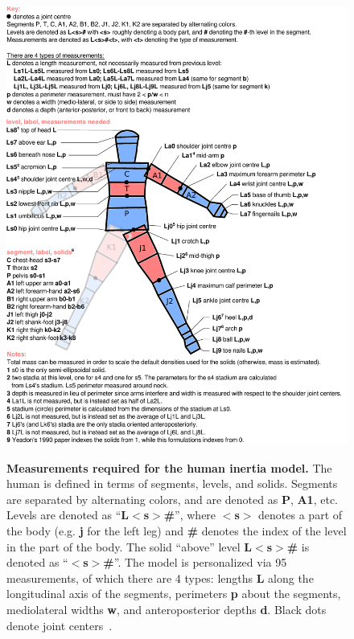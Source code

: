 \documentclass[10pt]{article}
\begin{document}
\begin{figure}[!ht]
  \begin{center}
    \includegraphics[height=6in]{figfactory/measurements.pdf}
  \end{center}
  \caption{
    {\bf Measurements required for the human inertia model.}  The human is
    defined in terms of segments, levels, and solids. Segments are separated by
    alternating colors, and are denoted as \textbf{P}, \textbf{A1}, etc. Levels
    are denoted as ``\textbf{L$<$s$>$\#}'', where \textbf{$<$s$>$} denotes a
    part of the body (e.g. \textbf{j} for the left leg) and \textbf{\#} denotes
    the index of the level in the part of the body. The solid ``above'' level
    \textbf{L$<$s$>$\#} is denoted as ``\textbf{$<$s$>$\#}''. The model is
    personalized via 95 measurements, of which there are 4 types: lengths
    \textbf{L} along the longitudinal axis of the segments, perimeters
    \textbf{p} about the segments, mediolateral widths \textbf{w}, and
    anteroposterior depths \textbf{d}. Black dots denote joint centers~\cite{Yeadon1990c}.
  }
  \label{fig:meas}
\end{figure}
\end{document}
